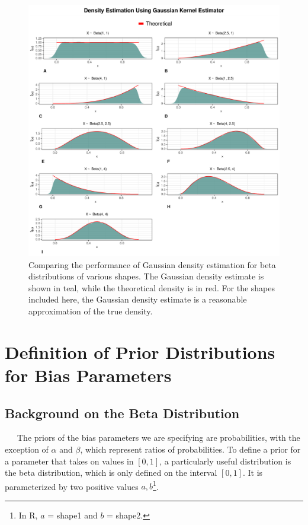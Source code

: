 \documentclass[12pt,twoside]{smiththesis}
\begin{document}
\newpage
\begin{figure}

{\centering \includegraphics[width=1\linewidth]{figure/compare-gaussian} 

}

\caption{\label{fig:gaus}Comparing the performance of Gaussian density estimation for beta distributions of various shapes. The Gaussian density estimate is shown in teal, while the theoretical density is in red. For the shapes included here, the Gaussian density estimate is a reasonable approximation of the true density.}\label{fig:unnamed-chunk-35}
\end{figure}
\hypertarget{defpriors}{%
\chapter{Definition of Prior Distributions for Bias Parameters}\label{defpriors}}

\hypertarget{background-on-the-beta-distribution}{%
\section{Background on the Beta Distribution}\label{background-on-the-beta-distribution}}

~~~The priors of the bias parameters we are specifying are probabilities, with the exception of \(\alpha\) and \(\beta\), which represent ratios of probabilities. To define a prior for a parameter that takes on values in \([0,1]\), a particularly useful distribution is the beta distribution, which is only defined on the interval \([0,1]\). It is parameterized by two positive values \(a, b\)\footnote{In R, \(a\) = shape1 and \(b\) = shape2.}.
\end{document}

